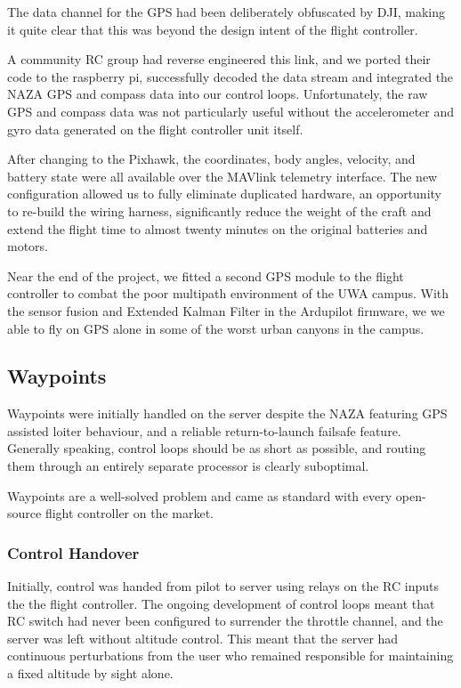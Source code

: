 \documentclass{article}
\begin{document}
      The data channel for the GPS had been deliberately obfuscated by DJI, making it quite clear that this was beyond the design intent of the flight controller.
      
      A community RC group had reverse engineered this link, and we ported their code to the raspberry pi, successfully decoded the data stream and integrated the NAZA GPS and compass data into our control loops.
      Unfortunately, the raw GPS and compass data was not particularly useful without the accelerometer and gyro data generated on the flight controller unit itself.

      After changing to the Pixhawk, the coordinates, body angles, velocity, and battery state were all available over the MAVlink telemetry interface.
      The new configuration allowed us to fully eliminate duplicated hardware, an opportunity to re-build the wiring harness, significantly reduce the weight of the craft and extend the flight time to almost twenty minutes on the original batteries and motors.

      Near the end of the project, we fitted a second GPS module to the flight controller to combat the poor multipath environment of the UWA campus.  With the sensor fusion and Extended Kalman Filter in the Ardupilot firmware, we we able to fly on GPS alone in some of the worst urban canyons in the campus.

    \subsection{Waypoints}
      Waypoints were initially handled on the server despite the NAZA featuring GPS assisted loiter behaviour, and a reliable return-to-launch failsafe feature.  Generally speaking, control loops should be as short as possible, and routing them through an entirely separate processor is clearly suboptimal.
      
      Waypoints are a well-solved problem and came as standard with every open-source flight controller on the market.

    \subsubsection{Control Handover}
      Initially, control was handed from pilot to server using relays on the RC inputs the the flight controller.  The ongoing development of control loops meant that RC switch had never been configured to surrender the throttle channel, and the server was left without altitude control.
      This meant that the server had continuous perturbations from the user who remained responsible for maintaining a fixed altitude by sight alone.
\end{document}
